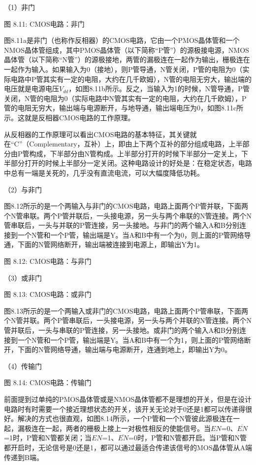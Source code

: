 \documentclass[]{ctexbook}
\begin{document}
（1）非门

图 8.11: CMOS电路：非门

图8.11a是非门（也称作反相器）的CMOS电路，它由一个PMOS晶体管和一个NMOS晶体管组成，其中PMOS晶体管（以下简称``P管''）的源极接电源，NMOS晶体管（以下简称``N管''）的源极接地，两管的漏极连在一起作为输出，栅极连在一起作为输入。如果输入为0（接地），则P管导通，N管关闭，P管的电阻为0（实际电路中P管其实有一定的电阻，大约在几千欧姆），N管的电阻无穷大，输出端的电压就是电源电压\(V_{dd}\)，如图8.11b所示。反之，当输入为1的时候，N管导通，P管关闭，N管的电阻为0（实际电路中N管其实有一定的电阻，大约在几千欧姆），P管的电阻无穷大，输出端与电源断开，与地导通，输出端电压为0，如图8.11c所示。这就是反相器CMOS电路的工作原理。

从反相器的工作原理可以看出CMOS电路的基本特征，其关键就在``C''（Complementary，互补）上，即由上下两个互补的部分组成电路，上半部分由P管构成，下半部分由N管构成。上半部分打开的时候下半部分一定关上，下半部分打开的时候上半部分一定关闭。这种电路设计的好处是：在稳定状态，电路中总有一端是关死的，几乎没有直流电流，可以大幅度降低功耗。

（2）与非门

图8.12所示的是一个两输入与非门的CMOS电路，电路上面两个P管并联，下面两个N管串联。两个P管并联后，一头接电源，另一头与两个串联的N管连接。两个N管串联后，一头与并联的P管连接，另一头接地。与非门的两个输入A和B分别连接到一个N管和一个P管，输出端是Y。当A和B中有一个为0，则上面的P管网络导通，下面的N管网络断开，输出端被连接到电源上，即输出Y为1。

图 8.12: CMOS电路：与非门

（3）或非门

图 8.13: CMOS电路：或非门

图8.13所示的是一个两输入或非门的CMOS电路，电路上面两个P管串联，下面两个N管并联。两个P管串联后，一头接电源，另一头与两个并联的N管连接。两个N管并联后，一头与串联的P管连接，另一头接地。或非门的两个输入A和B分别连接到一个N管和一个P管，输出端是Y。当A和B中有一个为1，则上面的P管网络断开，下面的N管网络导通，输出端与电源断开，连通到地上，即输出Y为0。

（4）传输门

图 8.14: CMOS电路：传输门

前面提到过单纯的PMOS晶体管或是NMOS晶体管都不是理想的开关，但是在设计电路时有时需要一个接近理想状态的开关，该开关无论对于0还是1都可以传递得很好。解决的方式也很直观，如图8.14所示，一个P管和一个N管彼此源极连在一起，漏极连在一起，两者的栅极上接上一对极性相反的使能信号。当\(EN\)=0、\(\overline{EN}\)=1时，P管和N管都关闭；当\(EN\)=1、\(\overline{EN}\)=0时，P管和N管都开启。当P管和N管都开启时，无论信号是0还是1，都可以通过最适合传递该信号的MOS晶体管从A端传递到B端。
\end{document}
